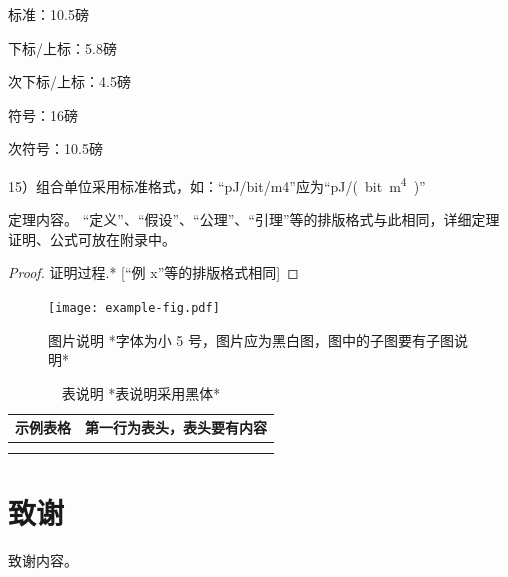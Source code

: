 \documentclass{cjc}
\begin{document}
标准：10.5磅

下标/上标：5.8磅

次下标/上标：4.5磅

符号：16磅

次符号：10.5磅

15）组合单位采用标准格式，如：“pJ/bit/m4”应为“\si{pJ/(bit.m^4)}”


\begin{theorem}
  定理内容。
  “定义”、“假设”、“公理”、“引理”等的排版格式与此相同，详细定理证明、公式可放在附录中。
\end{theorem}

\begin{proof}
  证明过程.* [“例 x”等的排版格式相同]
\end{proof}

\begin{figure}[htb]
  \centering
  \texttt{[image: example-fig.pdf]}
  \caption{图片说明 *字体为小 5 号，图片应为黑白图，图中的子图要有子图说明*}
\end{figure}

\begin{table}[htb]
  \centering
  \caption{表说明 *表说明采用黑体*}
  \small
  \begin{tabular}{cc}
    \toprule
    示例表格 & 第一行为表头，表头要有内容 \\
    \midrule
             &                            \\
    \midrule
             &                            \\
    \bottomrule
  \end{tabular}
\end{table}





\section*{致谢}

致谢内容。


\nocite{*}
\end{document}
